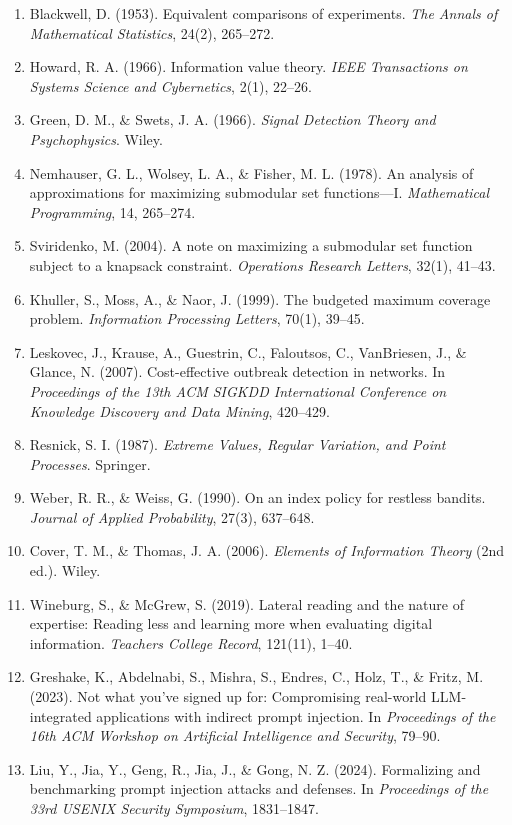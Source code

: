 \documentclass[
  11pt]{article}
\begin{document}
\begin{enumerate}
\item
  Blackwell, D. (1953). Equivalent comparisons of experiments. \emph{The Annals of Mathematical Statistics}, 24(2), 265--272.
\item
  Howard, R. A. (1966). Information value theory. \emph{IEEE Transactions on Systems Science and Cybernetics}, 2(1), 22--26.
\item
  Green, D. M., \& Swets, J. A. (1966). \emph{Signal Detection Theory and Psychophysics}. Wiley.
\item
  Nemhauser, G. L., Wolsey, L. A., \& Fisher, M. L. (1978). An analysis of approximations for maximizing submodular set functions---I. \emph{Mathematical Programming}, 14, 265--274.
\item
  Sviridenko, M. (2004). A note on maximizing a submodular set function subject to a knapsack constraint. \emph{Operations Research Letters}, 32(1), 41--43.
\item
  Khuller, S., Moss, A., \& Naor, J. (1999). The budgeted maximum coverage problem. \emph{Information Processing Letters}, 70(1), 39--45.
\item
  Leskovec, J., Krause, A., Guestrin, C., Faloutsos, C., VanBriesen, J., \& Glance, N. (2007). Cost-effective outbreak detection in networks. In \emph{Proceedings of the 13th ACM SIGKDD International Conference on Knowledge Discovery and Data Mining}, 420--429.
\item
  Resnick, S. I. (1987). \emph{Extreme Values, Regular Variation, and Point Processes}. Springer.
\item
  Weber, R. R., \& Weiss, G. (1990). On an index policy for restless bandits. \emph{Journal of Applied Probability}, 27(3), 637--648.
\item
  Cover, T. M., \& Thomas, J. A. (2006). \emph{Elements of Information Theory} (2nd ed.). Wiley.
\item
  Wineburg, S., \& McGrew, S. (2019). Lateral reading and the nature of expertise: Reading less and learning more when evaluating digital information. \emph{Teachers College Record}, 121(11), 1--40.
\item
  Greshake, K., Abdelnabi, S., Mishra, S., Endres, C., Holz, T., \& Fritz, M. (2023). Not what you've signed up for: Compromising real-world LLM-integrated applications with indirect prompt injection. In \emph{Proceedings of the 16th ACM Workshop on Artificial Intelligence and Security}, 79--90.
\item
  Liu, Y., Jia, Y., Geng, R., Jia, J., \& Gong, N. Z. (2024). Formalizing and benchmarking prompt injection attacks and defenses. In \emph{Proceedings of the 33rd USENIX Security Symposium}, 1831--1847.

\end{enumerate}
\end{document}

